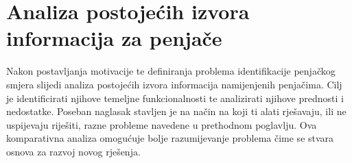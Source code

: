 \chapter{Analiza postojećih izvora informacija za penjače}

Nakon postavljanja motivacije te definiranja problema identifikacije penjačkog smjera slijedi analiza postojećih izvora informacija namijenjenih penjačima. Cilj je identificirati njihove temeljne funkcionalnosti te analizirati njihove prednosti i nedostatke. Poseban naglasak stavljen je na način na koji ti alati rješavaju, ili ne uspijevaju riješiti, razne probleme navedene u prethodnom poglavlju. Ova komparativna analiza omogućuje bolje razumijevanje problema čime se stvara osnova za razvoj novog rješenja.


